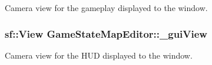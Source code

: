 Camera view for the gameplay displayed to the window. 

\hypertarget{class_game_state_map_editor_a9677013fca9851f15737457edcf96e82}{
\subsubsection[{\+\_\+gui\+View}]{\setlength{\rightskip}{0pt plus 5cm}sf\+::\+View Game\+State\+Map\+Editor\+::\+\_\+gui\+View\hspace{0.3cm}{\ttfamily [private]}}}\label{class_game_state_map_editor_a9677013fca9851f15737457edcf96e82}


Camera view for the H\+U\+D displayed to the window. 

